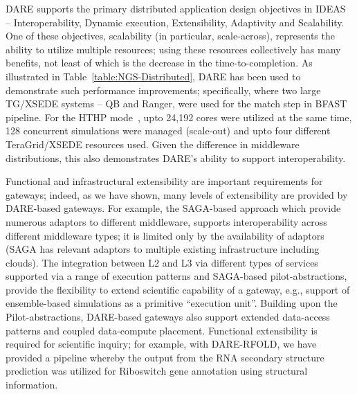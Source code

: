 \documentclass[]{svjour3}
\begin{document}
DARE supports the primary distributed application design objectives in
IDEAS~\cite{ideas} -- Interoperability, Dynamic execution,
Extensibility, Adaptivity and Scalability. One of these objectives,
scalability (in particular, scale-across), represents the ability to
utilize multiple resources; using these resources collectively has
many benefits, not least of which is the decrease in the
time-to-completion.  As illustrated in
Table~\ref{table:NGS-Distributed}, DARE has been used to demonstrate
such performance improvements; specifically, where two large TG/XSEDE
systems -- QB and Ranger, were used for the match step in BFAST
pipeline. For the HTHP mode~\cite{bigjob-ccgrid12}, upto 24,192 cores
were utilized at the same time, 128 concurrent simulations were
managed (scale-out) and upto four different TeraGrid/XSEDE resources
used. Given the difference in middleware distributions, this also
demonstrates DARE's ability to support interoperability.





Functional and infrastructural extensibility are important
requirements for gateways; indeed, as we have shown, many levels of
extensibility are provided by DARE-based gateways.  For example, the
SAGA-based approach which provide numerous adaptors to different
middleware, supports interoperability across different middleware
types; it is limited only by the availability of adaptors (SAGA has
relevant adaptors to multiple existing infrastructure including
clouds).  The integration between L2 and L3 via different types of
services supported via a range of execution patterns and SAGA-based
pilot-abstractions, provide the flexibility to extend scientific
capability of a gateway, e.g., support of ensemble-based simulations
as a primitive ``execution unit''.  Building upon the
Pilot-abstractions, DARE-based gateways also support extended
data-access patterns and coupled data-compute placement.  Functional
extensibility is required for scientific inquiry; for example, with
DARE-RFOLD, we have provided a pipeline whereby the output from the
RNA secondary structure prediction was utilized for Riboswitch gene
annotation using structural information.
\end{document}

